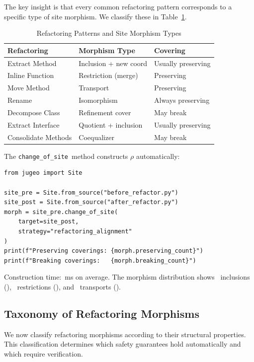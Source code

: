 \documentclass[11pt]{article}
\newcommand{\ChangeOfSite}{\texttt{change\_of\_site}}
\newcommand{\RefactorMorph}{\rho}
\begin{document}
The key insight is that every common refactoring pattern corresponds to
a specific type of site morphism.  We classify these in
Table~\ref{tab:refactor-types}.

\begin{table}[H]
\centering
\caption{Refactoring Patterns and Site Morphism Types}
\label{tab:refactor-types}
\begin{tabular}{lll}
\toprule
\textbf{Refactoring} & \textbf{Morphism Type} & \textbf{Covering} \\
\midrule
Extract Method & Inclusion + new coord & Usually preserving \\
Inline Function & Restriction (merge) & Preserving \\
Move Method & Transport & Preserving \\
Rename & Isomorphism & Always preserving \\
Decompose Class & Refinement cover & May break \\
Extract Interface & Quotient + inclusion & Usually preserving \\
Consolidate Methods & Coequalizer & May break \\
\bottomrule
\end{tabular}
\end{table}

The \ChangeOfSite\ method constructs $\RefactorMorph$ automatically:
\begin{lstlisting}[style=jugeo-python]
from jugeo import Site

site_pre = Site.from_source("before_refactor.py")
site_post = Site.from_source("after_refactor.py")
morph = site_pre.change_of_site(
    target=site_post,
    strategy="refactoring_alignment"
)
print(f"Preserving coverings: {morph.preserving_count}")
print(f"Breaking coverings:   {morph.breaking_count}")
\end{lstlisting}
Construction time: \compProfChangeOfSiteMeanMs\,ms on average.  The
morphism distribution shows \compMorphInclusion\ inclusions
(\compMorphInclusionPct), \compMorphRestriction\ restrictions
(\compMorphRestrictionPct), and \compMorphTransport\ transports
(\compMorphTransportPct).

\subsection{Taxonomy of Refactoring Morphisms}\label{ssec:morph-taxonomy}

We now classify refactoring morphisms according to their structural
properties.  This classification determines which safety guarantees hold
automatically and which require verification.
\end{document}
